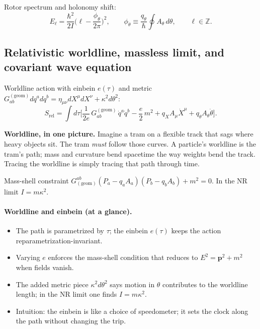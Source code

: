 Rotor spectrum and holonomy shift:
\begin{equation}
 E_\ell=\frac{\hbar^2}{2I}\Big(\ell-\frac{\phi_\theta}{2\pi}\Big)^2,\qquad \phi_\theta\equiv\frac{q_\theta}{\hbar}\oint A_\theta\,d\theta,\qquad \ell\in\mathbb Z.
\end{equation}

\subsection{Relativistic worldline, massless limit, and covariant wave equation}\label{sec:relativistic-worldline}
Worldline action with einbein $e(\tau)$ and metric $G^{(\mathrm{geom})}_{ab}dq^adq^b=\eta_{\mu\nu}dX^\mu dX^\nu+\kappa^2 d\theta^2$:
\begin{equation}
 S_{\mathrm{rel}}=\int d\tau\Big[\frac{1}{2e}\,G^{(\mathrm{geom})}_{ab}\,\dot q^a\dot q^b - \frac{e}{2}\,m^2 + q_X A_\mu\dot X^\mu + q_\theta A_\theta\dot\theta\Big].
\end{equation}

    \begin{idea}
      	\textbf{Worldline, in one picture.} Imagine a tram on a flexible track that sags where heavy objects sit. The tram \emph{must} follow those curves. A particle’s worldline is the tram’s path; mass and curvature bend spacetime the way weights bend the track. Tracing the worldline is simply tracing that path through time.
    \end{idea}
Mass-shell constraint $G^{ab}_{\mathrm{(geom)}}(P_a-q_aA_a)(P_b-q_bA_b)+m^2=0$. In the NR limit $I=m\kappa^2$.

\paragraph{Worldline and einbein (at a glance).}
\begin{itemize}
  \item The path is parametrized by $\tau$; the einbein $e(\tau)$ keeps the action reparametrization-invariant.
  \item Varying $e$ enforces the mass-shell condition that reduces to $E^2=\bm p^2+m^2$ when fields vanish.
  \item The added metric piece $\kappa^2 d\theta^2$ says motion in $\theta$ contributes to the worldline length; in the NR limit one finds $I=m\kappa^2$.
  \item Intuition: the einbein is like a choice of speedometer; it sets the clock along the path without changing the trip.
\end{itemize}

